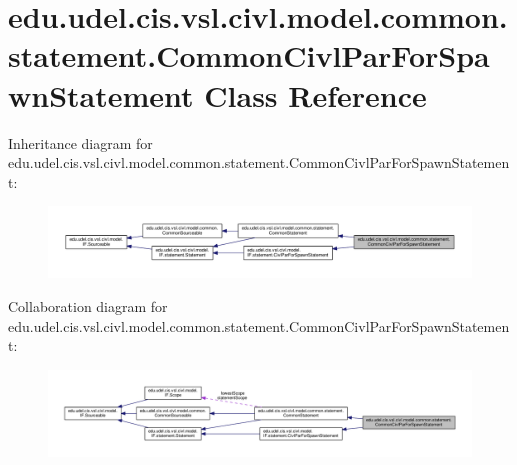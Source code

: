 \hypertarget{classedu_1_1udel_1_1cis_1_1vsl_1_1civl_1_1model_1_1common_1_1statement_1_1CommonCivlParForSpawnStatement}{}\section{edu.\+udel.\+cis.\+vsl.\+civl.\+model.\+common.\+statement.\+Common\+Civl\+Par\+For\+Spawn\+Statement Class Reference}
\label{classedu_1_1udel_1_1cis_1_1vsl_1_1civl_1_1model_1_1common_1_1statement_1_1CommonCivlParForSpawnStatement}


Inheritance diagram for edu.\+udel.\+cis.\+vsl.\+civl.\+model.\+common.\+statement.\+Common\+Civl\+Par\+For\+Spawn\+Statement\+:
\nopagebreak
\begin{figure}[H]
\begin{center}
\leavevmode
\includegraphics[width=350pt]{classedu_1_1udel_1_1cis_1_1vsl_1_1civl_1_1model_1_1common_1_1statement_1_1CommonCivlParForSpawnStatement__inherit__graph}
\end{center}
\end{figure}


Collaboration diagram for edu.\+udel.\+cis.\+vsl.\+civl.\+model.\+common.\+statement.\+Common\+Civl\+Par\+For\+Spawn\+Statement\+:
\nopagebreak
\begin{figure}[H]
\begin{center}
\leavevmode
\includegraphics[width=350pt]{classedu_1_1udel_1_1cis_1_1vsl_1_1civl_1_1model_1_1common_1_1statement_1_1CommonCivlParForSpawnStatement__coll__graph}
\end{center}
\end{figure}
